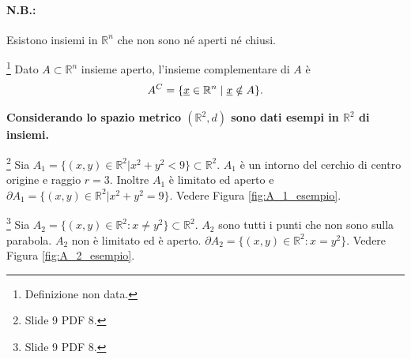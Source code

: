 \paragraph{N.B.:} Esistono insiemi in $\mathbb R^n$ che non sono né aperti né chiusi.

\begin{definition}\footnote{Definizione non data.}
    Dato $A\subset\mathbb R^n$ insieme aperto, l'insieme complementare di $A$ è
    \begin{equation*}
        A^C=\{\uline x\in\mathbb R^n\;|\; \uline x\notin A\}.
    \end{equation*}
\end{definition}

\textbf{Considerando lo spazio metrico $(\mathbb R^2, d)$ sono dati esempi in $\mathbb R^2$ di insiemi.}
\begin{example}\footnote{Slide 9 PDF 8.}
    Sia $A_1=\{(x,y)\in\mathbb R^2|x^2+y^2<9\}\subset\mathbb R^2$. $A_1$ è un intorno del cerchio di centro origine e raggio $r=3$. Inoltre $A_1$ è limitato ed aperto e $\partial A_1=\{(x,y)\in\mathbb R^2|x^2+y^2=9\}$. Vedere Figura \ref{fig:A_1_esempio}.
\end{example}

\begin{example}\footnote{Slide 9 PDF 8.}
    Sia $A_2=\{(x, y)\in\mathbb R^2\colon x\neq y^2\}\subset\mathbb R^2$. $A_2$ sono tutti i punti che non sono sulla parabola. $A_2$ non è limitato ed è aperto. $\partial A_2=\{(x,y)\in\mathbb R^2\colon x=y^2\}$. Vedere Figura \ref{fig:A_2_esempio}.
\end{example}

